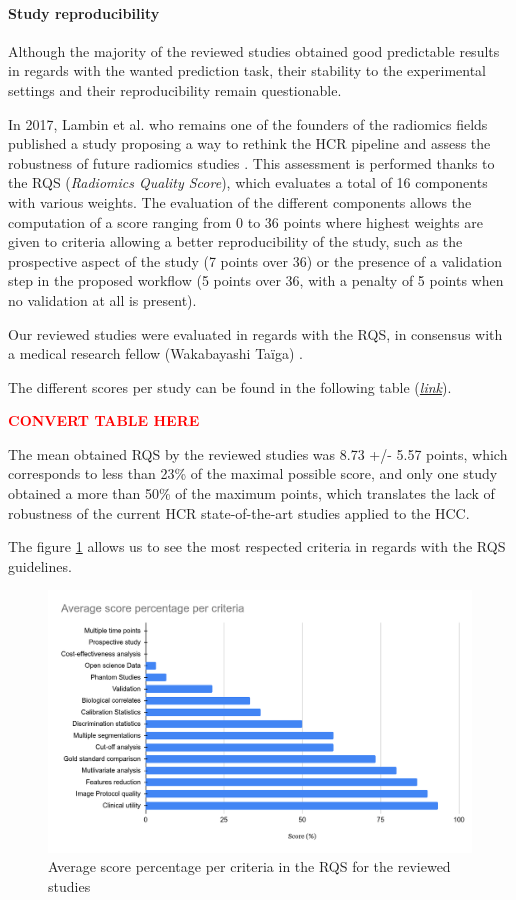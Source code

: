 \documentclass[]{article}
\let\oldparagraph\paragraph
\renewcommand{\paragraph}[1]{\oldparagraph{#1}\mbox{}}
\begin{document}
\paragraph{Study reproducibility}\label{study-reproducibility}

Although the majority of the reviewed studies obtained good predictable
results in regards with the wanted prediction task, their stability to
the experimental settings and their reproducibility remain questionable.

In 2017, Lambin et al. who remains one of the founders of the
radiomics fields \cite{Lambin2012} published a study
proposing a way to rethink the HCR pipeline and assess the robustness of
future radiomics studies \cite{Lambin2017}. This
assessment is performed thanks to the RQS (\emph{Radiomics Quality
Score}), which evaluates a total of 16 components with various weights.
The evaluation of the different components allows the computation of a
score ranging from 0 to 36 points where highest weights are given to
criteria allowing a better reproducibility of the study, such as the
prospective aspect of the study (7 points over 36) or the presence of a
validation step in the proposed workflow (5 points over 36, with a
penalty of 5 points when no validation at all is present).

Our reviewed studies were evaluated in regards with the RQS, in
consensus with a medical research fellow (Wakabayashi Taïga) \cite{Wakabayashi2019}.

The different scores per study can be found in the following table
(\href{https://docs.google.com/spreadsheets/u/0/d/10EHNALN2_6ZavU7049n6CwTfJO_vd6WBod64u8YNbHg/edit}{\emph{link}}).

\textcolor{red}{\textbf{CONVERT TABLE HERE}}

The mean obtained RQS by the reviewed studies was 8.73 +/- 5.57
points, which corresponds to less than 23\% of the maximal possible
score, and only one study obtained a more than 50\% of the maximum
points, which translates the lack of robustness of the current
HCR state-of-the-art studies applied to the HCC.

The figure \ref{RQS_points_per_criteria} allows us to see the most respected criteria in regards
with the RQS guidelines.


\begin{figure}[th!]
\centering
\includegraphics[width=0.7\linewidth]{images/image13}
\caption{Average score percentage per criteria in the RQS for the reviewed studies}
\label{RQS_points_per_criteria}
\end{figure}
\end{document}
